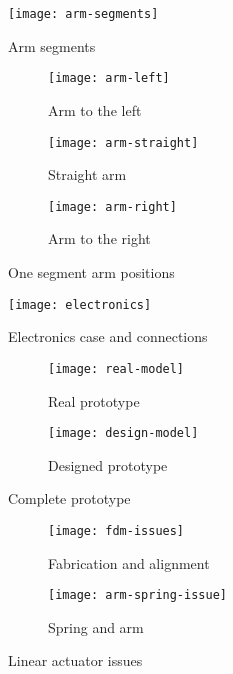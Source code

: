 \begin{figure}
    \centering
    \texttt{[image: arm-segments]}
    \caption{Arm segments}
    \label{arm-segmentes}
\end{figure}


\begin{figure}
    \centering
    \begin{subfigure}[b]{0.3\textwidth}
        \texttt{[image: arm-left]}
        \caption{Arm to the left}
        \label{fig:arm-left}
    \end{subfigure}
    \begin{subfigure}[b]{0.3\textwidth}
        \texttt{[image: arm-straight]}
        \caption{Straight arm}
        \label{fig:arm-straight}
    \end{subfigure}
    \begin{subfigure}[b]{0.3\textwidth}
        \texttt{[image: arm-right]}
        \caption{Arm to the right}
        \label{fig:arm-right}
    \end{subfigure}
    \caption{One segment arm positions}
    \label{arm-positions}
\end{figure}

\begin{figure}
    \centering
    \texttt{[image: electronics]}
    \caption{Electronics case and connections}
    \label{electronics}
\end{figure}

\begin{figure}
    \centering
    \begin{subfigure}[b]{0.3\textwidth}
        \texttt{[image: real-model]}
        \caption{Real prototype}
        \label{fig:real-model}
    \end{subfigure}
    \begin{subfigure}[b]{0.3\textwidth}
        \texttt{[image: design-model]}
        \caption{Designed prototype}
        \label{fig:design-model}
    \end{subfigure}
    \caption{Complete prototype}
    \label{complete-prototype}
\end{figure}

\begin{figure}
    \centering
    \begin{subfigure}[t]{0.6\textwidth}
        \texttt{[image: fdm-issues]}
        \caption{Fabrication and alignment}
        \label{fig:fdm-issues}
    \end{subfigure}
    \begin{subfigure}[t]{0.3\textwidth}
        \texttt{[image: arm-spring-issue]}
        \caption{Spring and arm}
        \label{fig:arm-spring-issue}
    \end{subfigure}
    \caption{Linear actuator issues}
    \label{manufacturing-issues}
\end{figure}



